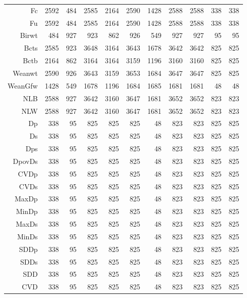 \begin{table}[p]
\begin{tabular}{rrrrrrrrrrr}
  Fc & 2592 & 484 & 2585 & 2164 & 2590 & 1428 & 2588 & 2588 & 338 & 338 \\ 
  Fu & 2592 & 484 & 2585 & 2164 & 2590 & 1428 & 2588 & 2588 & 338 & 338 \\ 
  Birwt & 484 & 927 & 923 & 862 & 926 & 549 & 927 & 927 &  95 &  95 \\ 
  Bcts & 2585 & 923 & 3648 & 3164 & 3643 & 1678 & 3642 & 3642 & 825 & 825 \\ 
  Bctb & 2164 & 862 & 3164 & 3164 & 3159 & 1196 & 3160 & 3160 & 825 & 825 \\ 
  Weanwt & 2590 & 926 & 3643 & 3159 & 3653 & 1684 & 3647 & 3647 & 825 & 825 \\ 
  WeanGfw & 1428 & 549 & 1678 & 1196 & 1684 & 1685 & 1681 & 1681 &  48 &  48 \\ 
  NLB & 2588 & 927 & 3642 & 3160 & 3647 & 1681 & 3652 & 3652 & 823 & 823 \\ 
  NLW & 2588 & 927 & 3642 & 3160 & 3647 & 1681 & 3652 & 3652 & 823 & 823 \\ 
  Dp & 338 &  95 & 825 & 825 & 825 &  48 & 823 & 823 & 825 & 825 \\ 
  Ds & 338 &  95 & 825 & 825 & 825 &  48 & 823 & 823 & 825 & 825 \\ 
  Dps & 338 &  95 & 825 & 825 & 825 &  48 & 823 & 823 & 825 & 825 \\ 
  DpovDs & 338 &  95 & 825 & 825 & 825 &  48 & 823 & 823 & 825 & 825 \\ 
  CVDp & 338 &  95 & 825 & 825 & 825 &  48 & 823 & 823 & 825 & 825 \\ 
  CVDs & 338 &  95 & 825 & 825 & 825 &  48 & 823 & 823 & 825 & 825 \\ 
  MaxDp & 338 &  95 & 825 & 825 & 825 &  48 & 823 & 823 & 825 & 825 \\ 
  MinDp & 338 &  95 & 825 & 825 & 825 &  48 & 823 & 823 & 825 & 825 \\ 
  MaxDs & 338 &  95 & 825 & 825 & 825 &  48 & 823 & 823 & 825 & 825 \\ 
  MinDs & 338 &  95 & 825 & 825 & 825 &  48 & 823 & 823 & 825 & 825 \\ 
  SDDp & 338 &  95 & 825 & 825 & 825 &  48 & 823 & 823 & 825 & 825 \\ 
  SDDs & 338 &  95 & 825 & 825 & 825 &  48 & 823 & 823 & 825 & 825 \\ 
  SDD & 338 &  95 & 825 & 825 & 825 &  48 & 823 & 823 & 825 & 825 \\ 
  CVD & 338 &  95 & 825 & 825 & 825 &  48 & 823 & 823 & 825 & 825 \\ 

\end{tabular}
\end{table}
